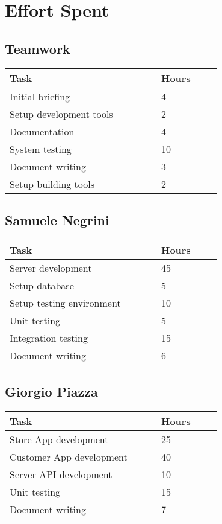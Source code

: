 \chapter{Effort Spent}

\section{Teamwork}
\vspace{2mm}
\begin{center}
    \begin{tabular}{@{}p{0.5\linewidth} p{0.2\linewidth}@{}}
        \hline
        \textbf{Task} & \textbf{Hours} \\ \hline
        Initial briefing & 4 \\ \hline
		Setup development tools & 2 \\ \hline
		Documentation & 4 \\ \hline
		System testing & 10 \\ \hline
		Document writing & 3 \\ \hline
		Setup building tools & 2 \\ \hline
    \end{tabular}
\end{center}

\section{Samuele Negrini}
\vspace{2mm}
\begin{center}
	\begin{tabular}{@{}p{0.5\linewidth} p{0.2\linewidth}@{}}
		\hline
		\textbf{Task} & \textbf{Hours} \\ \hline
		Server development & 45 \\ \hline
		Setup database & 5 \\ \hline
		Setup testing environment & 10 \\ \hline
		Unit testing & 5 \\ \hline
		Integration testing & 15 \\ \hline
		Document writing & 6 \\ \hline
	\end{tabular}
\end{center}

\section{Giorgio Piazza}
\vspace{2mm}
\begin{center}
	\begin{tabular}{@{}p{0.5\linewidth} p{0.2\linewidth}@{}}
		\hline
		\textbf{Task} & \textbf{Hours} \\ \hline
		Store App development & 25 \\ \hline
		Customer App development & 40 \\ \hline
	    Server API development  & 10 \\ \hline
	    Unit testing & 15 \\ \hline
		Document writing & 7 \\ \hline
	\end{tabular}
\end{center}